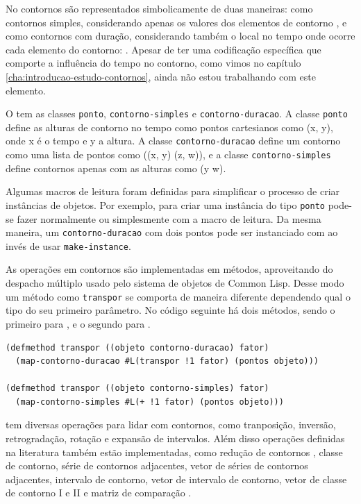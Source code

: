 No \goiaba{} contornos são representados simbolicamente de duas
maneiras: como contornos simples, considerando apenas os valores dos
elementos de contorno , e como contornos com duração,
considerando também o local no tempo onde ocorre cada elemento do
contorno: . Apesar de ter uma codificação
específica que comporte a influência do tempo no contorno, como vimos
no capítulo \ref{cha:introducao-estudo-contornos}, ainda não estou
trabalhando com este elemento.

O \goiaba{} tem as classes \texttt{ponto}, \texttt{contorno-simples} e
\texttt{contorno-duracao}. A classe \texttt{ponto} define as alturas
de contorno no tempo como pontos cartesianos como (x, y), onde x é o
tempo e y a altura. A classe \texttt{contorno-duracao} define um
contorno como uma lista de pontos como ((x, y) (z, w)), e a classe
\texttt{contorno-simples} define contornos apenas com as alturas como
(y w).

Algumas macros de leitura foram definidas para simplificar o processo
de criar instâncias de objetos. Por exemplo, para criar uma instância
do tipo \texttt{ponto} pode-se fazer normalmente  ou simplesmente  com a macro de
leitura. Da mesma maneira, um \texttt{contorno-duracao} com dois
pontos pode ser instanciado com  ao invés
de usar \texttt{make-instance}.

As operações em contornos são implementadas em métodos, aproveitando
do despacho múltiplo usado pelo sistema de objetos de Common
Lisp. Desse modo um método como \texttt{transpor} se comporta de
maneira diferente dependendo qual o tipo do seu primeiro parâmetro. No
código seguinte há dois métodos, sendo o primeiro para
, e o segundo para .

\break

\singlespacing
\begin{verbatim}
(defmethod transpor ((objeto contorno-duracao) fator)
  (map-contorno-duracao #L(transpor !1 fator) (pontos objeto)))

(defmethod transpor ((objeto contorno-simples) fator)
  (map-contorno-simples #L(+ !1 fator) (pontos objeto)))
\end{verbatim}
\doublespacing

\goiaba{} tem diversas operações para lidar com contornos, como
tranposição, inversão, retrogradação, rotação e expansão de
intervalos. Além disso operações definidas na literatura também estão
implementadas, como redução de contornos \cite{adams76:melodic},
classe de contorno, série de contornos adjacentes, vetor de séries de
contornos adjacentes, intervalo de contorno, vetor de intervalo de
contorno, vetor de classe de contorno I e II
\cite{friedmann85:methodology} e matriz de comparação
\cite{morris93:directions}.

